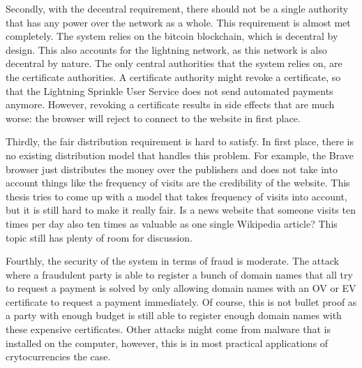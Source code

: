 Secondly, with the decentral requirement, there should not be a single authority that has any power over the network as a whole. This requirement is almost met completely. The system relies on the bitcoin blockchain, which is decentral by design. This also accounts for the lightning network, as this network is also decentral by nature. The only central authorities that the system relies on, are the certificate authorities. A certificate authority might revoke a certificate, so that the Lightning Sprinkle User Service does not send automated payments anymore. However, revoking a certificate results in side effects that are much worse: the browser will reject to connect to the website in first place. 

Thirdly, the fair distribution requirement is hard to satisfy. In first place, there is no existing distribution model that handles this problem. For example, the Brave browser just distributes the money over the publishers and does not take into account things like the frequency of visits are the credibility of the website. This thesis tries to come up with a model that takes frequency of visits into account, but it is still hard to make it really fair. Is a news website that someone visits ten times per day also ten times as valuable as one single Wikipedia article? This topic still has plenty of room for discussion. 

Fourthly, the security of the system in terms of fraud is moderate. The attack where a fraudulent party is able to register a bunch of domain names that all try to request a payment is solved by only allowing domain names with an OV or EV certificate to request a payment immediately. Of course, this is not bullet proof as a party with enough budget is still able to register enough domain names with these expensive certificates. Other attacks might come from malware that is installed on the computer, however, this is in most practical applications of crytocurrencies the case.

